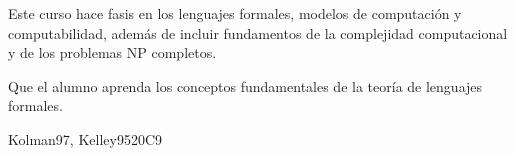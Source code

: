 \begin{syllabus}


\begin{justification}
Este curso hace fasis en los lenguajes formales, modelos de computación y computabilidad, además de incluir fundamentos de la complejidad computacional y de los problemas NP completos.
\end{justification}

\begin{goals}
\item Que el alumno aprenda los conceptos fundamentales de la teoría de lenguajes formales.
\end{goals}

\begin{outcomes}
    \item {}
    \item {}
    \item {}
\end{outcomes}

\begin{competences}
    \item {} 
    \item {} 
\end{competences}

\begin{unit}{\ALBasicAutomataComputabilityandComplexity}{}{Kolman97, Kelley95}{20}{C9}
\begin{topics}%
	\item \ALBasicAutomataComputabilityandComplexityTopicFinite
	\item \ALBasicAutomataComputabilityandComplexityTopicRegular
	\item \ALBasicAutomataComputabilityandComplexityTopicThe
	\item \ALBasicAutomataComputabilityandComplexityTopicContext
	\item \ALBasicAutomataComputabilityandComplexityTopicIntroduction
	\item \ALBasicAutomataComputabilityandComplexityTopicIntroductionTo
	\item \ALAdvancedAutomataTheoryandComputabilityTopicTuring
	\item \ALAdvancedAutomataTheoryandComputabilityTopicNondeterministic
	\item \ALAdvancedAutomataTheoryandComputabilityTopicChomsky
	\item \ALAdvancedAutomataTheoryandComputabilityTopicThe
	\item \ALAdvancedAutomataTheoryandComputabilityTopicComputability
	\item \ALAdvancedAutomataTheoryandComputabilityTopicRices
	\item \ALAdvancedAutomataTheoryandComputabilityTopicExamples
	\item \ALAdvancedAutomataTheoryandComputabilityTopicImplications	
\end{topics}
\begin{learningoutcomes}


\end{learningoutcomes}
\end{unit}
\end{syllabus}
